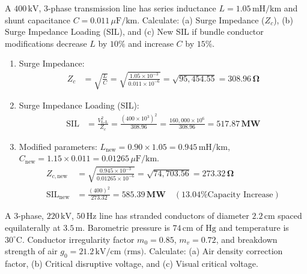 \documentclass[11pt,a4paper]{article}
\newenvironment{Problem}[1][Numerical Problem]{\begin{tcolorbox}[problembox, title=#1]}{\end{tcolorbox}}
\newenvironment{Solution}[1][Step-by-Step Solution]{\begin{tcolorbox}[solbox, title=#1]}{\end{tcolorbox}}
\begin{document}
\begin{Problem}[Problem 9: Surge Impedance Loading of a 400 kV Line]
A $400\,\text{kV}$, 3-phase transmission line has series inductance $L = 1.05\,\text{mH/km}$ and shunt capacitance $C = 0.011\,\mu\text{F/km}$. Calculate: (a) Surge Impedance ($Z_c$), (b) Surge Impedance Loading (SIL), and (c) New SIL if bundle conductor modifications decrease $L$ by $10\%$ and increase $C$ by $15\%$.
\end{Problem}

\begin{Solution}
\begin{enumerate}
  \item Surge Impedance:
    \begin{align*}
      Z_c &= \sqrt{\frac{L}{C}} = \sqrt{\frac{1.05 \times 10^{-3}}{0.011 \times 10^{-6}}} = \sqrt{95,454.55} = \mathbf{308.96\,\Omega}
    \end{align*}
  \item Surge Impedance Loading (SIL):
    \begin{align*}
      \text{SIL} &= \frac{V_{\text{L-L}}^2}{Z_c} = \frac{(400 \times 10^3)^2}{308.96} = \frac{160,000 \times 10^6}{308.96} = \mathbf{517.87\,\text{MW}}
    \end{align*}
  \item Modified parameters: $L_{\text{new}} = 0.90 \times 1.05 = 0.945\,\text{mH/km}$, $C_{\text{new}} = 1.15 \times 0.011 = 0.01265\,\mu\text{F/km}$.
    \begin{align*}
      Z_{c,\text{new}} &= \sqrt{\frac{0.945 \times 10^{-3}}{0.01265 \times 10^{-6}}} = \sqrt{74,703.56} = \mathbf{273.32\,\Omega} \\
      \text{SIL}_{\text{new}} &= \frac{(400)^2}{273.32} = \mathbf{585.39\,\text{MW}} \quad (\text{13.04\% Capacity Increase})
    \end{align*}
\end{enumerate}
\end{Solution}

\begin{Problem}[Problem 10: Critical Disruptive Voltage and Visual Corona Calculation]
A 3-phase, $220\,\text{kV}$, $50\,\text{Hz}$ line has stranded conductors of diameter $2.2\,\text{cm}$ spaced equilaterally at $3.5\,\text{m}$. Barometric pressure is $74\,\text{cm of Hg}$ and temperature is $30^\circ\text{C}$. Conductor irregularity factor $m_0 = 0.85$, $m_v = 0.72$, and breakdown strength of air $g_0 = 21.2\,\text{kV/cm (rms)}$. Calculate: (a) Air density correction factor, (b) Critical disruptive voltage, and (c) Visual critical voltage.
\end{Problem}
\end{document}
